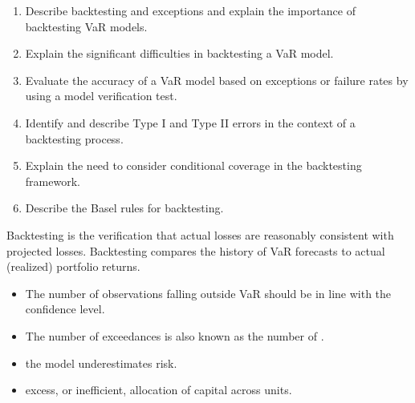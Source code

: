 
\begin{mrkeybox}[title={Learning objectives in this reading}]
\small
\begin{enumerate}[label=\textbf{\alph*.},leftmargin=1.7em]
\item Describe backtesting and exceptions and explain the importance of backtesting VaR models.
\item Explain the significant difficulties in backtesting a VaR model.
\item Evaluate the accuracy of a VaR model based on exceptions or failure rates by using a model
      verification test.
\item Identify and describe Type I and Type II errors in the context of a backtesting process.
\item Explain the need to consider conditional coverage in the backtesting framework.
\item Describe the Basel rules for backtesting.
\end{enumerate}
\end{mrkeybox}


\begin{mrdefbox}[title={Backtesting}]
Backtesting is the verification that actual losses are reasonably consistent with projected
losses. Backtesting compares the history of VaR forecasts to actual (realized) portfolio
returns.
\end{mrdefbox}

\begin{itemize}
\item The number of observations falling outside VaR should be in line with the confidence
      level.
\item The number of exceedances is also known as the number of .
\end{itemize}

\begin{mrtrapbox}[title={The two failure directions}]
\begin{itemize}
\item {} the model underestimates risk.
\item {} excess, or inefficient, allocation of capital across units.
\end{itemize}
\end{mrtrapbox}

